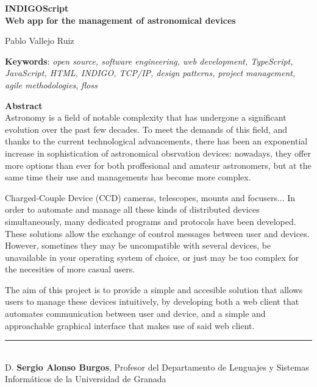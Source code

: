 \cleardoublepage

\begin{center}
	{\large\bfseries INDIGOScript \\ Web app for the management of astronomical devices}\\
\end{center}
\begin{center}
	Pablo Vallejo Ruiz\\
\end{center}
\vspace{0.5cm}
\noindent\textbf{Keywords}: \textit{open source, software engineering, web development, TypeScript, JavaScript, HTML, INDIGO, TCP/IP, design patterns, project management, agile methodologies}, \textit{floss}
\vspace{0.7cm}

\noindent\textbf{Abstract}\\
Astronomy is a field of notable complexity that has undergone a significant evolution over the past few decades. To meet the demands of this field, and thanks to the current technological advancements, there has been an exponential increase in sophistication of astronomical obsrvation devices: nowadays, they offer more options than ever for both proffesional and amateur astronomers, but at the same time their use and managements has become more complex.

Charged-Couple Device (CCD) cameras, telescopes, mounts and focusers... In order to automate and manage all these kinds of distributed devices simultaneously, many dedicated programs and protocols have been developed. These solutions allow the exchange of control messages between user and devices. However, sometines they may be uncompatible with several devices, be unavailable in your operating system of choice, or just may be too complex for the necesities of more casual users.

The aim of this project is to provide a simple and accesible solution that allows users to manage these devices intuitively, by developing both a web client that automates communication between user and device, and a simple and approachable graphical interface that makes use of said web client.

\cleardoublepage

\thispagestyle{empty}

\noindent\rule[-1ex]{\textwidth}{2pt}\\[4.5ex]

D. \textbf{Sergio Alonso Burgos}, Profesor del Departamento de Lenguajes y Sistemas Informáticos de la Universidad de Granada 

